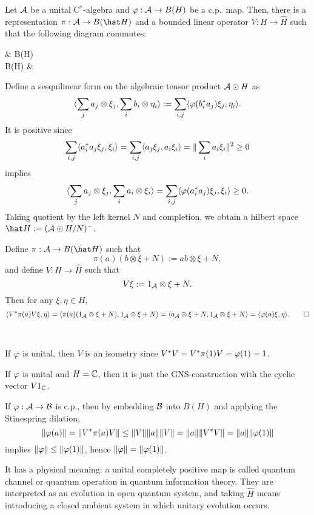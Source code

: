 \documentclass{../../small}
\begin{document}
\begin{thm}
Let $\mathcal{A}$ be a unital C$^*$-algebra and $\varphi:\mathcal{A}\to B(H)$ be a c.p.~map.
Then, there is a representation $\pi:\cA\to B(\hat H)$ and a bounded linear operator $V:H\to\hat H$ such that the following diagram commutes:
\begin{cd}
\cA {}  & B(H) \\
B(\hat H)  &
\end{cd}
\end{thm}
\begin{pf}
Define a sesquilinear form on the algebraic tensor product $\mathcal{A}\odot H$ as
\[\langle\sum_ja_j\otimes\xi_j,\sum_ib_i\otimes\eta_i\rangle:=\sum_{i,j}\langle\varphi(b_i^*a_j)\xi_j,\eta_i\rangle.\]
It is positive since
\[\sum_{i,j}\langle a_i^*a_j\xi_j,\xi_i\rangle=\sum_{i,j}\langle a_j\xi_j,a_i\xi_i\rangle=\|\sum_ia_i\xi_i\|^2\ge0\]
implies
\[\langle\sum_ja_j\otimes\xi_j,\sum_ia_i\otimes\xi_i\rangle=\sum_{i,j}\langle\varphi(a_i^*a_j)\xi_j,\xi_i\rangle\ge0.\]
Taking quotient by the left kernel $N$ and completion, we obtain a hilbert space $\hat H:=(\cA\odot H/N)^-$.

Define $\pi:\cA\to B(\hat H)$ such that
\[\pi(a)(b\otimes\xi+N):=ab\otimes\xi+N,\]
and define $V:H\to\hat H$ such that
\[V\xi:=1_{\mathcal{A}}\otimes\xi+N.\]
Then for any $\xi,\eta\in H$,
\[\langle V^*\pi(a)V\xi,\eta\rangle=\langle\pi(a)(1_{\mathcal{A}}\otimes\xi+N),1_{\mathcal{A}}\otimes\xi+N\rangle=\langle a_{\mathcal{A}}\otimes\xi+N,1_{\mathcal{A}}\otimes\xi+N\rangle=\langle\varphi(a)\xi,\eta\rangle.\qedhere\]
\end{pf}

\begin{rmk}\,
\begin{parts}
\item If $\varphi$ is unital, then $V$ is an isometry since $V^*V=V^*\pi(1)V=\varphi(1)=1$.
\item If $\varphi$ is unital and $H=\mathbb{C}$, then it is just the GNS-construction with the cyclic vector $V1_{\mathbb{C}}$.
\item If $\varphi:\mathcal{A}\to\mathcal{B}$ is c.p., then by embedding $\mathcal{B}$ into $B(H)$ and applying the Stinespring dilation,
\[\|\varphi(a)\|=\|V^*\pi(a)V\|\le\|V\|\|a\|\|V\|=\|a\|\|V^*V\|=\|a\|\|\varphi(1)\|\]
implies $\|\varphi\|\le\|\varphi(1)\|$, hence $\|\varphi\|=\|\varphi(1)\|$.
\item It has a physical meaning: a unital completely positive map is called quantum channel or quantum operation in quantum information theory. They are interpreted as an evolution in open quantum system, and taking $\hat H$ means introducing a closed ambient system in which unitary evolution occurs.
\end{parts}
\end{rmk}
\end{document}
